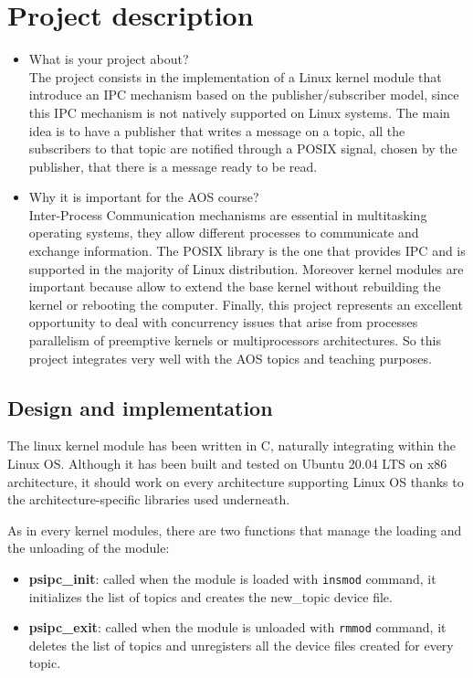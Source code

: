 \documentclass[10pt,a4]{article}
\newcommand{\code}[1]{\texttt{#1}}
\begin{document}
\section{Project description}

\begin{itemize}
\item What is your project about?\\
The project consists in the implementation of a Linux kernel module that introduce an IPC mechanism based on the publisher/subscriber model, 
since this IPC mechanism is not natively supported on Linux systems.
The main idea is to have a publisher that writes a message on a topic, all the subscribers to that topic are notified through a POSIX signal, chosen by the publisher, that there is a message ready to be read.

\item Why it is important for the AOS course?\\
Inter-Process Communication mechanisms are essential in multitasking operating systems, they allow different processes to communicate and exchange information.
The POSIX library is the one that provides IPC and is supported in the majority of Linux distribution.
Moreover kernel modules are important because allow to extend the base kernel without rebuilding the kernel or rebooting the computer.
Finally, this project represents an excellent opportunity to deal with concurrency issues that arise from processes parallelism of preemptive kernels or multiprocessors architectures. So this project integrates very well with the AOS topics and teaching purposes.
\end{itemize}

\subsection{Design and implementation}
The linux kernel module has been written in C, naturally integrating within the Linux OS. Although it has been built and tested on Ubuntu 20.04 LTS on x86 architecture, it should work on every architecture supporting Linux OS thanks to the architecture-specific libraries used underneath.

As in every kernel modules, there are two functions that manage the loading and the unloading of the module:

\begin{itemize}
  \item \textbf{psipc\_init}: called when the module is loaded with \code{insmod} command, it initializes the list of topics and creates the new\_topic device file.
  \item \textbf{psipc\_exit}: called when the module is unloaded with \code{rmmod} command, it deletes the list of topics and unregisters all the device files created for every topic.
\end{itemize}
\end{document}
